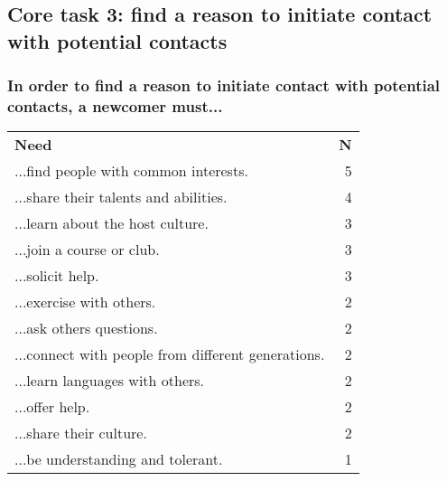 \subsection*{Core task 3: find a reason to initiate contact with potential contacts}

\subsubsection*{In order to find a reason to initiate contact with potential contacts, a newcomer must...}

\begin{longtable}{p{}r}
\textbf{Need}                                                                                              & \textbf{N} \\[12pt]
  ...find people with common interests.                                                                    & 5 \\
  ...share their talents and abilities.                                                                    & 4 \\
  ...learn about the host culture.                                                                         & 3 \\
  ...join a course or club.                                                                                & 3 \\
  ...solicit help.                                                                                         & 3 \\
  ...exercise with others.                                                                                 & 2 \\
  ...ask others questions.                                                                                 & 2 \\
  ...connect with people from different generations.                                                       & 2 \\
  ...learn languages with others.                                                                          & 2 \\
  ...offer help.                                                                                           & 2 \\
  ...share their culture.                                                                                  & 2 \\
  ...be understanding and tolerant.                                                                        & 1 \\

\end{longtable}
